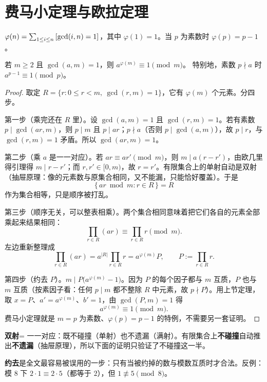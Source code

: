 \section{费马小定理与欧拉定理}
\begin{definition}
$\varphi(n)=\sum_{1\le i\le n}\left[\gcd(i,n)=1\right]$，其中 $\varphi(1)=1$。当 $p$ 为素数时 $\varphi(p)=p-1$。
\end{definition}
\begin{theorem}[欧拉定理与费马小定理]
若 $m\ge2$ 且 $\gcd(a,m)=1$，则 $a^{\varphi(m)}\equiv1\pmod m$。
特别地，素数 $p\nmid a$ 时 $a^{p-1}\equiv1\pmod p$。
\end{theorem}
\begin{proof}
取定 $R=\{r:0\le r<m,\ \gcd(r,m)=1\}$，它有 $\varphi(m)$ 个元素。分四步。

第一步（乘完还在 $R$ 里）。设 $\gcd(a,m)=1$ 且 $\gcd(r,m)=1$。若有素数 $p\mid\gcd(ar,m)$，则 $p\mid m$ 且 $p\mid ar$；$p\nmid a$（否则 $p\mid\gcd(a,m)$），故 $p\mid r$，与 $\gcd(r,m)=1$ 矛盾。所以 $\gcd(ar,m)=1$。

第二步（乘 $a$ 是一一对应）。若 $ar\equiv ar'\pmod m$，则 $m\mid a(r-r')$，由欧几里得引理得 $m\mid r-r'$；而 $r,r'\in[0,m)$，故 $r=r'$。有限集合上的单射自动是双射（抽屉原理：像的元素数与原集合相同，又不能漏，只能恰好覆盖）。于是
\[
 \{\,ar\bmod m:r\in R\,\}=R
\]
作为集合相等，只是顺序被打乱。

第三步（顺序无关，可以整表相乘）。两个集合相同意味着把它们各自的元素全部乘起来结果相同：
\[
 \prod_{r\in R}(ar)\equiv\prod_{r\in R}r\pmod m.
\]
左边重新整理成
\[
 \prod_{r\in R}(ar)=a^{|R|}\prod_{r\in R}r=a^{\varphi(m)}P,\qquad P:=\prod_{r\in R}r .
\]

第四步（约去 $P$）。$m\mid P\big(a^{\varphi(m)}-1\big)$。因为 $P$ 的每个因子都与 $m$ 互质，$P$ 也与 $m$ 互质（按素因子看：任何 $p\mid m$ 都不整除 $R$ 中元素，故 $p\nmid P$）。用上节定理，取 $x=P$、$a'=a^{\varphi(m)}$、$b'=1$，由 $\gcd(P,m)=1$ 得
\[
 a^{\varphi(m)}\equiv1\pmod m.
\]
费马小定理就是 $m=p$ 为素数、$\varphi(p)=p-1$ 的特例，不需要另一套证明。
\end{proof}

\begin{tip}[词义：双射（这里为何只验一半）]
\textbf{双射}= 一一对应：既不碰撞（单射）也不遗漏（满射）。有限集合上\textbf{不碰撞}自动推出\textbf{不遗漏}（抽屉原理），所以下面的证明只验证了不碰撞这一半。
\end{tip}

\begin{tip}[小心：约去必须互质]
\textbf{约去}是全文最容易被误用的一步：只有当被约掉的数与模数互质时才合法。反例：模 $8$ 下 $2\cdot1\equiv2\cdot5$（都等于 $2$），但 $1\not\equiv5\pmod 8$。
\end{tip}


